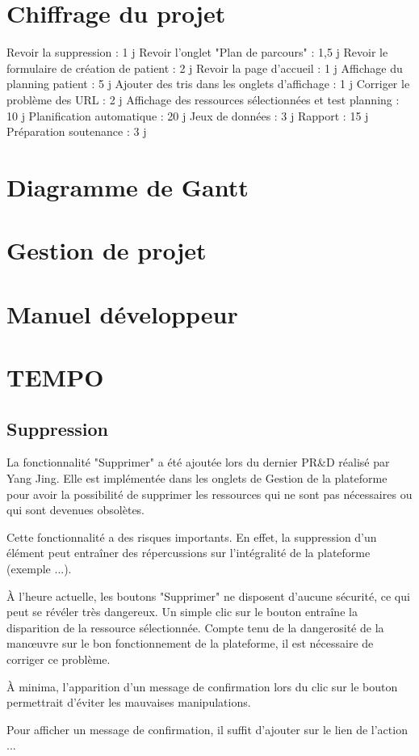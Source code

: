 \documentclass{polytech/polytech}
\begin{document}
\chapter{Chiffrage du projet}
\label{ann:chiffrage}

Revoir la suppression : 1 j
Revoir l'onglet "Plan de parcours" : 1,5 j
Revoir le formulaire de création de patient : 2 j
Revoir la page d'accueil : 1 j
Affichage du planning patient : 5 j
Ajouter des tris dans les onglets d'affichage : 1 j
Corriger le problème des URL : 2 j
Affichage des ressources sélectionnées et test planning : 10 j
Planification automatique : 20 j
Jeux de données : 3 j
Rapport : 15 j
Préparation soutenance : 3 j

\chapter{Diagramme de Gantt}
\label{ann:gantt}

\chapter{Gestion de projet}
\label{ann:gestion}

\chapter{Manuel développeur}


\chapter{TEMPO}

\section*{Suppression}

La fonctionnalité "Supprimer" a été ajoutée lors du dernier PR\&D réalisé par Yang Jing. Elle est implémentée dans les onglets de Gestion de la plateforme pour avoir la possibilité de supprimer les ressources qui ne sont pas nécessaires ou qui sont devenues obsolètes.  

Cette fonctionnalité a des risques importants. En effet, la suppression d'un élément peut entraîner des répercussions sur l'intégralité de la plateforme (exemple ...). 

À l'heure actuelle, les boutons "Supprimer" ne disposent d'aucune sécurité, ce qui peut se révéler très dangereux. Un simple clic sur le bouton entraîne la disparition de la ressource sélectionnée. Compte tenu de la dangerosité de la manœuvre sur le bon fonctionnement de la plateforme, il est nécessaire de corriger ce problème. 

À minima, l'apparition d'un message de confirmation lors du clic sur le bouton permettrait d'éviter les mauvaises manipulations. 

Pour afficher un message de confirmation, il suffit d'ajouter  sur le lien de l'action ...
\end{document}
